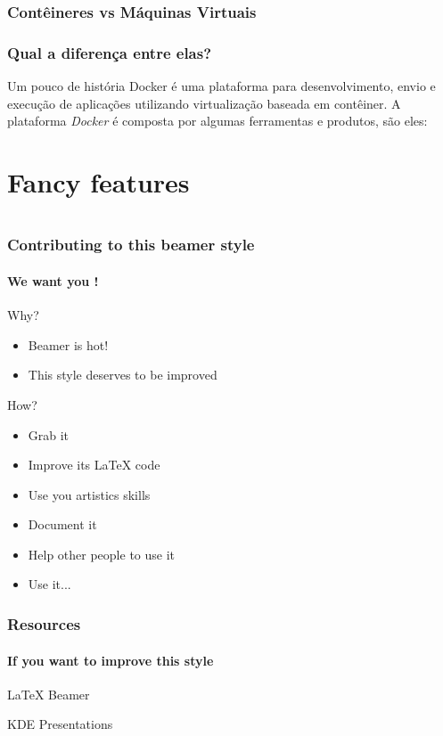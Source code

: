 \documentclass[12pt]{beamer}
\begin{document}
\begin{frame}
  \frametitle{Contêineres vs Máquinas Virtuais}
  \frametitle{Qual a diferença entre elas?}
  \begin{block}{Um pouco de história}
					Docker é uma plataforma para desenvolvimento, envio e execução de
					aplicações utilizando virtualização baseada em contêiner.
					A plataforma \emph{Docker} é composta por algumas ferramentas e
					produtos, são eles:
  \end{block}
\end{frame}

\section{Fancy features}

\section*{}
\begin{frame}
  \frametitle{Contributing to this beamer style}
  \framesubtitle{We want you !}

  \begin{block}{Why?}
  \begin{itemize}
    \item Beamer is hot!
    \item This style deserves to be improved
  \end{itemize}
  \end{block}

  \begin{block}{How?}
  \begin{itemize}
    \item Grab it
    \item Improve its LaTeX code
    \item Use you artistics skills
    \item Document it
    \item Help other people to use it
    \item Use it...
  \end{itemize}
  \end{block}
\end{frame}

\begin{frame}
  \frametitle{Resources}
  \framesubtitle{If you want to improve this style}
  \begin{thebibliography}{10}

  \beamertemplatearticlebibitems

    LaTeX Beamer

    KDE Presentations

  \end{thebibliography}
\end{frame}

\end{document}
